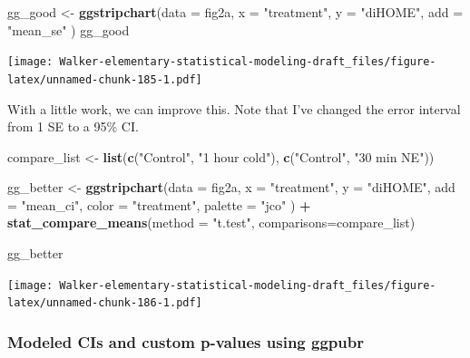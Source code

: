 \documentclass[]{book}
\newenvironment{Shaded}{\begin{snugshade}}{\end{snugshade}}
\newcommand{\DataTypeTok}[1]{\textcolor[rgb]{0.13,0.29,0.53}{#1}}
\newcommand{\KeywordTok}[1]{\textcolor[rgb]{0.13,0.29,0.53}{\textbf{#1}}}
\newcommand{\NormalTok}[1]{#1}
\newcommand{\OperatorTok}[1]{\textcolor[rgb]{0.81,0.36,0.00}{\textbf{#1}}}
\newcommand{\StringTok}[1]{\textcolor[rgb]{0.31,0.60,0.02}{#1}}
\begin{document}
\begin{Shaded}
\begin{Highlighting}[]
\NormalTok{gg_good <-}\StringTok{ }\KeywordTok{ggstripchart}\NormalTok{(}\DataTypeTok{data =}\NormalTok{ fig2a,}
                    \DataTypeTok{x =} \StringTok{"treatment"}\NormalTok{,}
                    \DataTypeTok{y =} \StringTok{"diHOME"}\NormalTok{,}
                    \DataTypeTok{add =} \StringTok{"mean_se"}
\NormalTok{)}
\NormalTok{gg_good}
\end{Highlighting}
\end{Shaded}

\texttt{[image: Walker-elementary-statistical-modeling-draft\_files/figure-latex/unnamed-chunk-185-1.pdf]}

With a little work, we can improve this. Note that I've changed the error interval from 1 SE to a 95\% CI.

\begin{Shaded}
\begin{Highlighting}[]
\NormalTok{compare_list <-}\StringTok{ }\KeywordTok{list}\NormalTok{(}\KeywordTok{c}\NormalTok{(}\StringTok{"Control"}\NormalTok{, }\StringTok{"1 hour cold"}\NormalTok{), }\KeywordTok{c}\NormalTok{(}\StringTok{"Control"}\NormalTok{, }\StringTok{"30 min NE"}\NormalTok{))}

\NormalTok{gg_better <-}\StringTok{ }\KeywordTok{ggstripchart}\NormalTok{(}\DataTypeTok{data =}\NormalTok{ fig2a,}
                    \DataTypeTok{x =} \StringTok{"treatment"}\NormalTok{,}
                    \DataTypeTok{y =} \StringTok{"diHOME"}\NormalTok{,}
                    \DataTypeTok{add =} \StringTok{"mean_ci"}\NormalTok{,}
                    \DataTypeTok{color =} \StringTok{"treatment"}\NormalTok{,}
                    \DataTypeTok{palette =} \StringTok{"jco"}
\NormalTok{) }\OperatorTok{+}
\StringTok{  }\KeywordTok{stat_compare_means}\NormalTok{(}\DataTypeTok{method =} \StringTok{"t.test"}\NormalTok{,}
                     \DataTypeTok{comparisons=}\NormalTok{compare_list)}

\NormalTok{gg_better}
\end{Highlighting}
\end{Shaded}

\texttt{[image: Walker-elementary-statistical-modeling-draft\_files/figure-latex/unnamed-chunk-186-1.pdf]}

\hypertarget{modeled-cis-and-custom-p-values-using-ggpubr}{%
\subsubsection{Modeled CIs and custom p-values using ggpubr}\label{modeled-cis-and-custom-p-values-using-ggpubr}}
\end{document}
